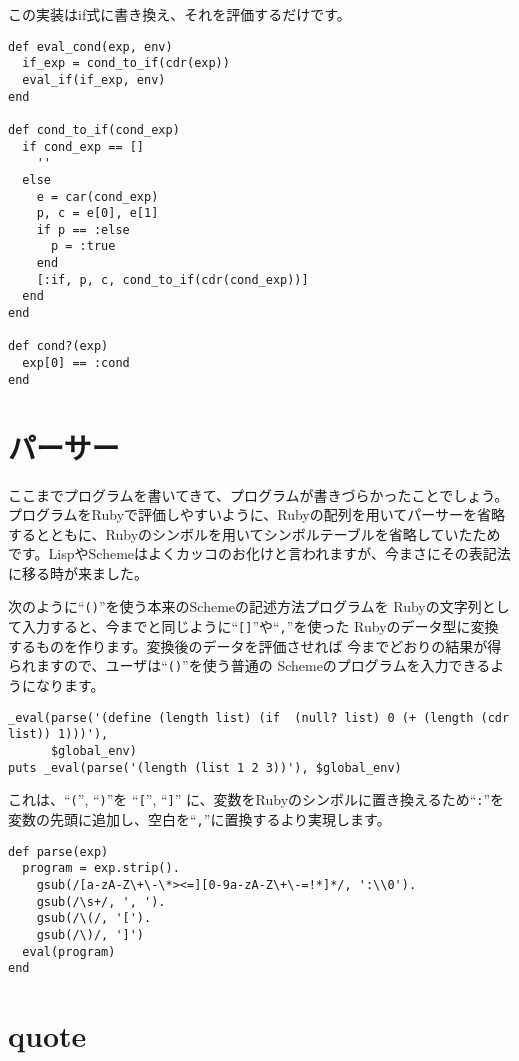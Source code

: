 この実装はif式に書き換え、それを評価するだけです。

\begin{lstlisting}
def eval_cond(exp, env)
  if_exp = cond_to_if(cdr(exp))
  eval_if(if_exp, env)
end

def cond_to_if(cond_exp)
  if cond_exp == []
    ''
  else
    e = car(cond_exp)
    p, c = e[0], e[1]
    if p == :else
      p = :true
    end
    [:if, p, c, cond_to_if(cdr(cond_exp))]
  end  
end

def cond?(exp)
  exp[0] == :cond
end
\end{lstlisting}

\section{パーサー}

ここまでプログラムを書いてきて、プログラムが書きづらかったことでしょう。プログラムをRubyで評価しやすいように、Rubyの配列を用いてパーサーを省略するとともに、Rubyのシンボルを用いてシンボルテーブルを省略していたためです。LispやSchemeはよくカッコのお化けと言われますが、今まさにその表記法に移る時が来ました。

次のように“{\tt ()}”を使う本来のSchemeの記述方法プログラムを
Rubyの文字列として入力すると、今までと同じように“{\tt []}”や“{\tt ,}”を使った
Rubyのデータ型に変換するものを作ります。変換後のデータを評価させれば
今までどおりの結果が得られますので、ユーザは“{\tt ()}”を使う普通の
Schemeのプログラムを入力できるようになります。

\begin{lstlisting}
_eval(parse('(define (length list) (if  (null? list) 0 (+ (length (cdr list)) 1)))'), 
      $global_env)
puts _eval(parse('(length (list 1 2 3))'), $global_env)
\end{lstlisting}

これは、“{\tt (}”, “{\tt )}”を “{\tt [}”, “{\tt ]}”
に、変数をRubyのシンボルに置き換えるため“{\tt :}”を変数の先頭に追加し、空白を“{\tt ,}”に置換するより実現します。

\label{fun:parse}

\begin{lstlisting}
def parse(exp)
  program = exp.strip().
    gsub(/[a-zA-Z\+\-\*><=][0-9a-zA-Z\+\-=!*]*/, ':\\0').
    gsub(/\s+/, ', ').
    gsub(/\(/, '[').
    gsub(/\)/, ']')
  eval(program)
end
\end{lstlisting}

\section{quote} \label{sec:quote}

